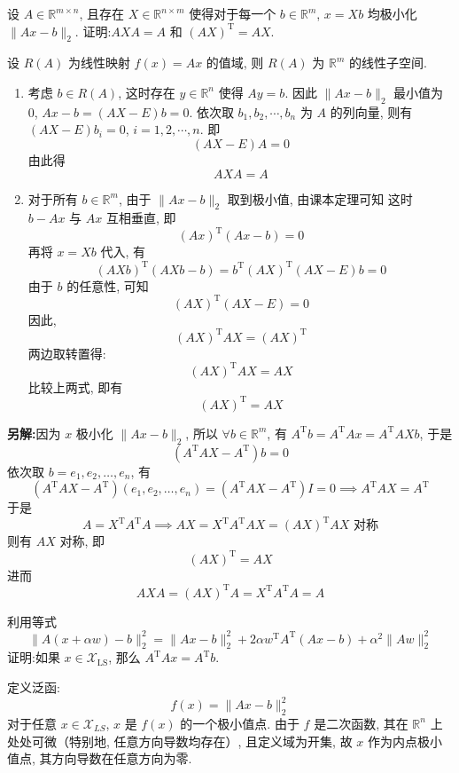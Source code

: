 \documentclass[12pt, answers]{exam}     %
\newcommand{\anothersolution}{\par\noindent\textbf{另解:}}
\newcommand{\XLS}{\mathcal{X}_{\mathrm{LS}}}
\newcommand{\R}{\mathbb{R}}
\newcommand{\T}{\mathrm{T}}
\begin{document}
\begin{questions}
\question{}设 \( A \in \R^{m \times n} \), 且存在 \( X \in \R^{n \times m} \) 使得对于每一个 \( b \in \R^m \), \( x = Xb \) 均极小化 \( \|Ax - b\|_2 \). 
证明:\( AXA = A \) 和 \( (AX)^{\T} = AX \). 

\begin{solution}
设 \( R(A) \) 为线性映射 \( f(x) = Ax \) 的值域, 则 \( R(A) \) 为 \( \R^m \) 的线性子空间. 
\begin{enumerate}
    \item
    考虑 \( b \in R(A) \), 这时存在 \( y \in \R^n \) 使得 \( Ay = b \). 因此 \( \|Ax - b\|_2 \) 最小值为 0, \( Ax - b = (AX - E)b = 0 \). 依次取 \( b_1, b_2, \cdots, b_n \) 为 \( A \) 的列向量, 则有 \( (AX - E)b_i = 0 \), \( i = 1, 2, \cdots, n \). 即
    \[
    (AX - E)A = 0
    \]
    由此得
    \[
    AXA = A
    \]
    \item
    对于所有 \( b \in \R^m \), 由于 \( \|Ax - b\|_2 \) 取到极小值, 由课本定理可知
    这时 \( b - Ax \) 与 \( Ax \) 互相垂直, 即
    \[
    (Ax)^{\T}(Ax - b) = 0
    \]
    再将 \( x = Xb \) 代入, 有
    \[
    (AXb)^{\T}(AXb - b) = b^{\T} (AX)^{\T} (AX - E) b = 0
    \]
    由于 \( b \) 的任意性, 可知
    \[
    (AX)^{\T} (AX - E) = 0
    \]
    因此, 
    \[
    (AX)^{\T} AX = (AX)^{\T}
    \]
    两边取转置得:
    \[
    (AX)^{\T} AX = AX
    \]
    比较上两式, 即有
    \[
    (AX)^{\T} = AX
    \]
\end{enumerate}

\anothersolution{}因为 $ x $ 极小化 \( \|Ax - b\|_2 \), 所以 $ \forall b \in \R^m $, 
有 $ A^{\T}b = A^{\T}Ax = A^{\T}AXb $, 于是
\[
(A^{\T}AX - A^{\T})b = 0
\]
依次取 $ b = e_1 , e_2, \dots, e_n $, 有
\[
(A^{\T}AX - A^{\T})(e_1, e_2, \dots, e_n) = (A^{\T}AX - A^{\T})I = 0 \implies A^{\T}AX = A^{\T}  
\]
于是
\[
A = X^{\T}A^{\T}A \implies AX = X^{\T}A^{\T}AX = (AX)^{\T}AX \text{ 对称}
\]  
则有 $ AX $ 对称, 即
\[
(AX)^{\T} = AX
\]
进而
\[
AXA = (AX)^{\T}A = X^{\T}A^{\T}A = A
\]
\end{solution}


\question{}利用等式
\[
\|A(x + \alpha w) - b\|_2^2 = \|Ax - b\|_2^2 + 2\alpha w^{\T} A^{\T} (Ax - b) + \alpha^2 \|Aw\|_2^2
\]
证明:如果 \( x \in \XLS \), 那么 \( A^{\T} A x = A^{\T} b \). 

\begin{solution}
定义泛函:
\[
f(x) = \|Ax - b\|_2^2
\]
对于任意 \(x \in \mathcal{X}_{LS}\), \(x\) 是 \(f(x)\) 的一个极小值点. 由于 \(f\) 是二次函数, 其在 \(\R^n\) 上处处可微（特别地, 任意方向导数均存在）, 且定义域为开集, 故 \(x\) 作为内点极小值点, 其方向导数在任意方向为零. 


\end{solution}
\end{questions}
\end{document}
